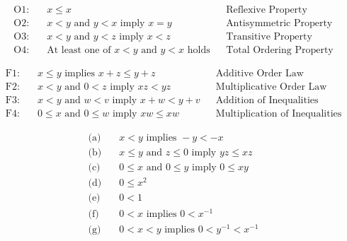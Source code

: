\begin{proposition}
\begin{align*}
    \text{O1:} &\quad x \leq x && \text{Reflexive Property} \\
    \text{O2:} &\quad x < y \text{ and } y < x \text{ imply } x = y && \text{Antisymmetric Property} \\
    \text{O3:} &\quad x < y \text{ and } y < z \text{ imply } x < z && \text{Transitive Property} \\
    \text{O4:} &\quad \text{At least one of } x < y \text{ and } y < x \text{ holds} && \text{Total Ordering Property}
\end{align*}
\end{proposition}

\begin{proposition}
\begin{align*}
    \text{F1:} &\quad x \leq y \text{ implies } x + z \leq y + z && \text{Additive Order Law} \\
    \text{F2:} &\quad x < y \text{ and } 0 < z \text{ imply } xz < yz && \text{Multiplicative Order Law} \\
    \text{F3:} &\quad x < y \text{ and } w < v \text{ imply } x + w < y + v && \text{Addition of Inequalities} \\
    \text{F4:} &\quad 0 \leq x \text{ and } 0 \leq w \text{ imply } xw \leq xw && \text{Multiplication of Inequalities}
\end{align*}
\end{proposition}

\begin{proposition}
\begin{align*}
    \text{(a)} &\quad x < y \text{ implies } -y < -x \\
    \text{(b)} &\quad x \leq y \text{ and } z \leq 0 \text{ imply } yz \leq xz \\
    \text{(c)} &\quad 0 \leq x \text{ and } 0 \leq y \text{ imply } 0 \leq xy \\
    \text{(d)} &\quad 0 \leq x^2 \\
    \text{(e)} &\quad 0 < 1 \\
    \text{(f)} &\quad 0 < x \text{ implies } 0 < x^{-1} \\
    \text{(g)} &\quad 0 < x < y \text{ implies } 0 < y^{-1} < x^{-1}
\end{align*}
\end{proposition}

